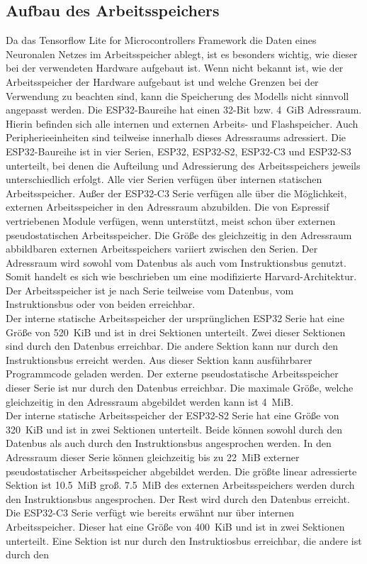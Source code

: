 \subsection{Aufbau des Arbeitsspeichers}\label{subsec:Aufbau des Arbeitsspeichers}
    Da das Tensorflow Lite for Microcontrollers Framework die Daten eines Neuronalen Netzes im Arbeitsspeicher ablegt, ist es besonders wichtig, wie dieser bei der verwendeten Hardware aufgebaut ist. Wenn nicht bekannt ist, wie der Arbeitsspeicher der Hardware aufgebaut ist und welche Grenzen bei der Verwendung zu beachten sind, kann die Speicherung des Modells nicht sinnvoll angepasst werden. Die ESP32-Baureihe hat einen 32-Bit bzw. \SI{4}{GiB} Adressraum. Hierin befinden sich alle internen und externen Arbeits- und Flashspeicher. Auch Peripherieeinheiten sind teilweise innerhalb dieses Adressraums adressiert. Die ESP32-Baureihe ist in vier Serien, ESP32, ESP32-S2, ESP32-C3 und ESP32-S3 unterteilt, bei denen die Aufteilung und Adressierung des Arbeitsspeichers jeweils unterschiedlich erfolgt. Alle vier Serien verfügen über internen statischen Arbeitsspeicher. Außer der ESP32-C3 Serie verfügen alle über die Möglichkeit, externen Arbeitsspeicher in den Adressraum abzubilden. Die von Espressif vertriebenen Module verfügen, wenn unterstützt, meist schon über externen pseudostatischen Arbeitsspeicher. Die Größe des gleichzeitig in den Adressraum abbildbaren externen Arbeitsspeichers variiert zwischen den Serien. Der Adressraum wird sowohl vom Datenbus als auch vom Instruktionsbus genutzt. Somit handelt es sich wie beschrieben um eine modifizierte Harvard-Architektur. Der Arbeitsspeicher ist je nach Serie teilweise vom Datenbus, vom Instruktionsbus oder von beiden erreichbar\cite{ESPCompare}\ESPTDM.\\ Der interne statische Arbeitsspeicher der ursprünglichen ESP32 Serie hat eine Größe von \SI{520}{KiB} und ist in drei Sektionen unterteilt. Zwei dieser Sektionen sind durch den Datenbus erreichbar. Die andere Sektion kann nur durch den Instruktionsbus erreicht werden. Aus dieser Sektion kann ausführbarer Programmcode geladen werden. Der externe pseudostatische Arbeitsspeicher dieser Serie ist nur durch den Datenbus erreichbar. Die maximale Größe, welche gleichzeitig in den Adressraum abgebildet werden kann ist \SI{4}{MiB}\cite{ESP32}.\\ Der interne statische Arbeitsspeicher der ESP32-S2 Serie hat eine Größe von \SI{320}{KiB} und ist in zwei Sektionen unterteilt. Beide können sowohl durch den Datenbus als auch durch den Instruktionsbus angesprochen werden. In den Adressraum dieser Serie können gleichzeitig bis zu \SI{22}{MiB} externer pseudostatischer Arbeitsspeicher abgebildet werden. Die größte linear adressierte Sektion ist \SI{10,5}{MiB} groß. \SI{7,5}{MiB} des externen Arbeitsspeichers werden durch den Instruktionsbus angesprochen. Der Rest wird durch den Datenbus erreicht\cite{ESP32-S2}.\\ Die ESP32-C3 Serie verfügt wie bereits erwähnt nur über internen Arbeitsspeicher. Dieser hat eine Größe von \SI{400}{KiB} und ist in zwei Sektionen unterteilt. Eine Sektion ist nur durch den Instruktiosbus erreichbar, die andere ist durch den 